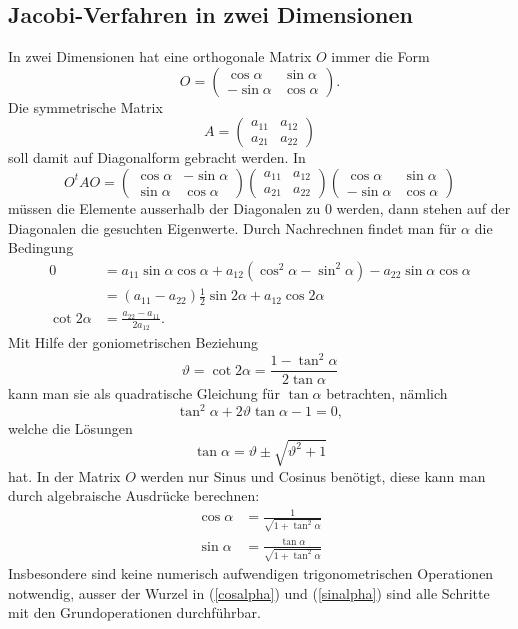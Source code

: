 \subsection{Jacobi-Verfahren in zwei Dimensionen\label{jacobi2d}}
In zwei Dimensionen hat eine orthogonale Matrix $O$ immer die
Form
\[
O=\begin{pmatrix}\cos\alpha&\sin\alpha\\-\sin\alpha&\cos\alpha\end{pmatrix}.
\]
Die symmetrische Matrix
\[
A=\begin{pmatrix}a_{11}&a_{12}\\a_{21}&a_{22}\end{pmatrix}
\]
soll damit auf Diagonalform gebracht werden.
In
\[
O^tAO
=
\begin{pmatrix}
\cos\alpha&-\sin\alpha\\
\sin\alpha& \cos\alpha
\end{pmatrix}
\begin{pmatrix}
a_{11}&a_{12}\\
a_{21}&a_{22}
\end{pmatrix}
\begin{pmatrix}
 \cos\alpha&\sin\alpha\\
-\sin\alpha&\cos\alpha
\end{pmatrix}
\]
müssen die Elemente ausserhalb der Diagonalen zu $0$ werden, dann
stehen auf der Diagonalen die gesuchten Eigenwerte.
Durch Nachrechnen findet man für $\alpha$ die Bedingung
\begin{align*}
0&=
a_{11}\sin\alpha\cos\alpha +a_{12}(\cos^2\alpha-\sin^2\alpha)
-a_{22}\sin\alpha\cos\alpha
\\
&=
(a_{11}-a_{22})
\frac12\sin2\alpha+a_{12}\cos2\alpha\\
\cot2\alpha&=\frac{a_{22}-a_{11}}{2a_{12}}.
\end{align*}
Mit Hilfe der goniometrischen Beziehung
\[
\vartheta=\cot2\alpha = \frac{1-\tan^2\alpha}{2\tan\alpha}
\]
kann man sie als quadratische Gleichung für $\tan\alpha$ betrachten, nämlich
\[
\tan^2\alpha+2\vartheta\tan\alpha-1=0,
\]
welche die Lösungen
\[
\tan\alpha=\vartheta\pm\sqrt{\vartheta^2+1}
\]
hat. In der Matrix $O$ werden nur Sinus und Cosinus benötigt, diese
kann man durch algebraische Ausdrücke berechnen:
\begin{align}
\cos\alpha&=\frac1{\sqrt{1+\tan^2\alpha}}\label{cosalpha}\\
\sin\alpha&=\frac{\tan\alpha}{\sqrt{1+\tan^2\alpha}}\label{sinalpha}
\end{align}
Insbesondere sind keine numerisch aufwendigen trigonometrischen Operationen
notwendig, ausser der Wurzel in (\ref{cosalpha}) und (\ref{sinalpha})
sind alle Schritte mit den Grundoperationen durchführbar.


